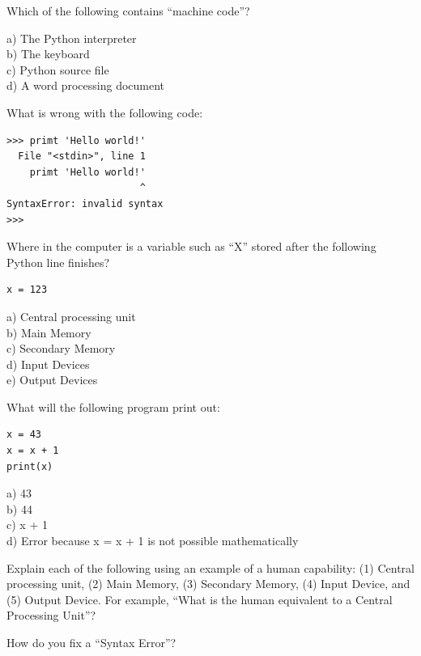 \begin{ex}
Which of the following contains ``machine code''?

a) The Python interpreter\\
b) The keyboard\\
c) Python source file\\
d) A word processing document
\end{ex}

\begin{ex}
What is wrong with the following code:

\beforeverb
\begin{verbatim}
>>> primt 'Hello world!'
  File "<stdin>", line 1
    primt 'Hello world!'
                       ^
SyntaxError: invalid syntax
>>> 
\end{verbatim}
\afterverb

\end{ex}

\begin{ex}
Where in the computer is a variable such as ``X'' stored 
after the following Python line finishes?

\beforeverb
\begin{verbatim}
x = 123
\end{verbatim}
\afterverb
%
a) Central processing unit\\
b) Main Memory\\
c) Secondary Memory\\
d) Input Devices\\
e) Output Devices
\end{ex}

\begin{ex}
What will the following program print out:

\beforeverb
\begin{verbatim}
x = 43
x = x + 1
print(x)
\end{verbatim}
\afterverb
%
a) 43\\
b) 44\\
c) x + 1\\
d) Error because x = x + 1 is not possible mathematically
\end{ex}

\begin{ex}
Explain each of the following using an example of a human capability: 
(1) Central processing unit, (2) Main Memory, (3) Secondary Memory, 
(4) Input Device, and
(5) Output Device.
For example, ``What is the human equivalent to a Central Processing Unit''? 
\end{ex}

\begin{ex}
How do you fix a ``Syntax Error''?
\end{ex}